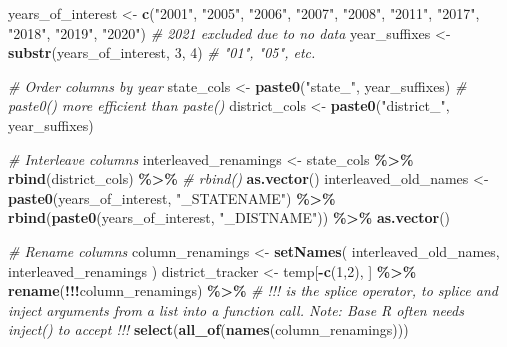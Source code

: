 \documentclass[
]{article}
\newenvironment{Shaded}{\begin{snugshade}}{\end{snugshade}}
\newcommand{\CommentTok}[1]{\textcolor[rgb]{0.56,0.35,0.01}{\textit{#1}}}
\newcommand{\DecValTok}[1]{\textcolor[rgb]{0.00,0.00,0.81}{#1}}
\newcommand{\FunctionTok}[1]{\textcolor[rgb]{0.13,0.29,0.53}{\textbf{#1}}}
\newcommand{\NormalTok}[1]{#1}
\newcommand{\OtherTok}[1]{\textcolor[rgb]{0.56,0.35,0.01}{#1}}
\newcommand{\SpecialCharTok}[1]{\textcolor[rgb]{0.81,0.36,0.00}{\textbf{#1}}}
\newcommand{\StringTok}[1]{\textcolor[rgb]{0.31,0.60,0.02}{#1}}
\begin{document}
\begin{Shaded}
\begin{Highlighting}[]
\NormalTok{years\_of\_interest }\OtherTok{\textless{}{-}} \FunctionTok{c}\NormalTok{(}\StringTok{"2001"}\NormalTok{, }\StringTok{"2005"}\NormalTok{, }\StringTok{"2006"}\NormalTok{, }\StringTok{"2007"}\NormalTok{, }\StringTok{"2008"}\NormalTok{, }\StringTok{"2011"}\NormalTok{, }\StringTok{"2017"}\NormalTok{, }\StringTok{"2018"}\NormalTok{, }\StringTok{"2019"}\NormalTok{, }\StringTok{"2020"}\NormalTok{) }\CommentTok{\# 2021 excluded due to no data}
\NormalTok{year\_suffixes }\OtherTok{\textless{}{-}} \FunctionTok{substr}\NormalTok{(years\_of\_interest, }\DecValTok{3}\NormalTok{, }\DecValTok{4}\NormalTok{)  }\CommentTok{\# "01", "05", etc.}

\CommentTok{\# Order columns by year}
\NormalTok{state\_cols }\OtherTok{\textless{}{-}} \FunctionTok{paste0}\NormalTok{(}\StringTok{"state\_"}\NormalTok{, year\_suffixes) }\CommentTok{\# paste0() more efficient than paste()}
\NormalTok{district\_cols }\OtherTok{\textless{}{-}} \FunctionTok{paste0}\NormalTok{(}\StringTok{"district\_"}\NormalTok{, year\_suffixes)}

\CommentTok{\# Interleave columns}
\NormalTok{interleaved\_renamings }\OtherTok{\textless{}{-}}\NormalTok{ state\_cols }\SpecialCharTok{\%\textgreater{}\%} 
  \FunctionTok{rbind}\NormalTok{(district\_cols) }\SpecialCharTok{\%\textgreater{}\%} \CommentTok{\# rbind()}
  \FunctionTok{as.vector}\NormalTok{()}
\NormalTok{interleaved\_old\_names }\OtherTok{\textless{}{-}} \FunctionTok{paste0}\NormalTok{(years\_of\_interest, }\StringTok{"\_STATENAME"}\NormalTok{) }\SpecialCharTok{\%\textgreater{}\%} 
  \FunctionTok{rbind}\NormalTok{(}\FunctionTok{paste0}\NormalTok{(years\_of\_interest, }\StringTok{"\_DISTNAME"}\NormalTok{)) }\SpecialCharTok{\%\textgreater{}\%}
  \FunctionTok{as.vector}\NormalTok{()}

\CommentTok{\# Rename columns}
\NormalTok{column\_renamings }\OtherTok{\textless{}{-}} \FunctionTok{setNames}\NormalTok{(}
\NormalTok{  interleaved\_old\_names, }
\NormalTok{  interleaved\_renamings}
\NormalTok{  )}
\NormalTok{district\_tracker }\OtherTok{\textless{}{-}}\NormalTok{ temp[}\SpecialCharTok{{-}}\FunctionTok{c}\NormalTok{(}\DecValTok{1}\NormalTok{,}\DecValTok{2}\NormalTok{), ] }\SpecialCharTok{\%\textgreater{}\%}
  \FunctionTok{rename}\NormalTok{(}\SpecialCharTok{!!!}\NormalTok{column\_renamings) }\SpecialCharTok{\%\textgreater{}\%} \CommentTok{\# \textasciigrave{}!!!\textasciigrave{} is the splice operator, to splice and inject arguments from a list into a function call. Note: Base R often needs inject() to accept \textasciigrave{}!!!\textasciigrave{}}
  \FunctionTok{select}\NormalTok{(}\FunctionTok{all\_of}\NormalTok{(}\FunctionTok{names}\NormalTok{(column\_renamings)))}



\end{Highlighting}
\end{Shaded}
\end{document}

